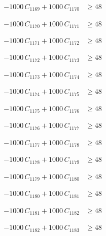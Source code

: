 \documentclass[a4paper,11pt]{article}
\begin{document}
\begin{align}
-1000\,C_{1169} + 1000\,C_{1170} &\geq 48 \nonumber
\end{align}

\begin{align}
-1000\,C_{1170} + 1000\,C_{1171} &\geq 48 \nonumber
\end{align}

\begin{align}
-1000\,C_{1171} + 1000\,C_{1172} &\geq 48 \nonumber
\end{align}

\begin{align}
-1000\,C_{1172} + 1000\,C_{1173} &\geq 48 \nonumber
\end{align}

\begin{align}
-1000\,C_{1173} + 1000\,C_{1174} &\geq 48 \nonumber
\end{align}

\begin{align}
-1000\,C_{1174} + 1000\,C_{1175} &\geq 48 \nonumber
\end{align}

\begin{align}
-1000\,C_{1175} + 1000\,C_{1176} &\geq 48 \nonumber
\end{align}

\begin{align}
-1000\,C_{1176} + 1000\,C_{1177} &\geq 48 \nonumber
\end{align}

\begin{align}
-1000\,C_{1177} + 1000\,C_{1178} &\geq 48 \nonumber
\end{align}

\begin{align}
-1000\,C_{1178} + 1000\,C_{1179} &\geq 48 \nonumber
\end{align}

\begin{align}
-1000\,C_{1179} + 1000\,C_{1180} &\geq 48 \nonumber
\end{align}

\begin{align}
-1000\,C_{1180} + 1000\,C_{1181} &\geq 48 \nonumber
\end{align}

\begin{align}
-1000\,C_{1181} + 1000\,C_{1182} &\geq 48 \nonumber
\end{align}

\begin{align}
-1000\,C_{1182} + 1000\,C_{1183} &\geq 48 \nonumber
\end{align}
\end{document}
